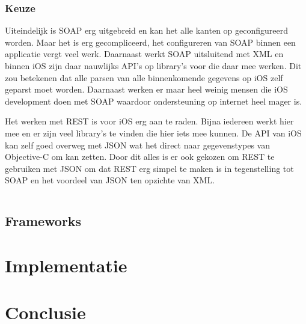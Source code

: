 \documentclass[a4paper,11pt,oneside]{report}
\begin{document}
\subsection{Keuze}
Uiteindelijk is SOAP erg uitgebreid en kan het alle kanten op geconfigureerd
worden. Maar het is erg gecompliceerd, het configureren van SOAP binnen een
applicatie vergt veel werk. Daarnaast werkt SOAP uitsluitend met XML en binnen
iOS zijn daar nauwlijks API's op library's voor die daar mee werken. Dit zou
betekenen dat alle parsen van alle binnenkomende gegevens op iOS zelf geparst
moet worden. Daarnaast werken er maar heel weinig mensen die iOS development
doen met SOAP waardoor ondersteuning op internet heel mager is.

Het werken met REST is voor iOS erg aan te raden. Bijna iedereen werkt hier mee
en er zijn veel library's te vinden die hier iets mee kunnen. De API van iOS kan
zelf goed overweg met JSON wat het direct naar gegevenstypes van Objective-C om
kan zetten. Door dit alles is er ook gekozen om REST te gebruiken met JSON om
dat REST erg simpel te maken is in tegenstelling tot SOAP en het voordeel van
JSON ten opzichte van XML.

\begin{lstlisting}
\end{lstlisting}


\section{Frameworks}

\chapter{Implementatie}











\chapter{Conclusie}




\appendix
\end{document}
